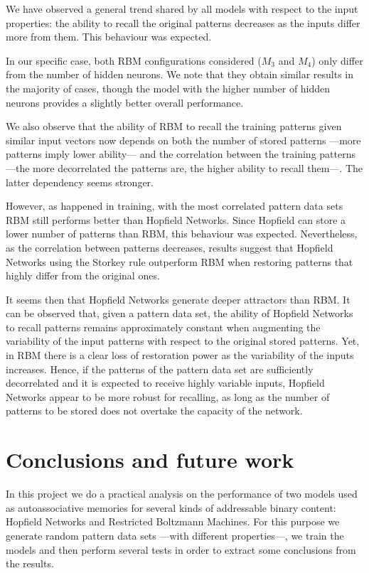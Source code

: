 \documentclass[anon]{CI}
\begin{document}
We have observed a general trend shared by all models with respect to the input properties: the ability to recall the original patterns decreases as the inputs differ more from them. This behaviour was expected.

In our specific case, both RBM configurations considered ($M_3$ and $M_4$) only differ from the number of hidden neurons. We note that they obtain similar results in the majority of cases, though the model with the higher number of hidden neurons provides a slightly better overall performance.

We also observe that the ability of RBM to recall the training patterns given similar input vectors now depends on both the number of stored patterns ---more patterns imply lower ability--- and the correlation between the training patterns ---the more decorrelated the patterns are, the higher ability to recall them---. The latter dependency seems stronger.

However, as happened in training, with the most correlated pattern data sets RBM still performs better than Hopfield Networks. Since Hopfield can store a lower number of patterns than RBM, this behaviour was expected. Nevertheless, as the correlation between patterns decreases, results suggest that Hopfield Networks using the Storkey rule outperform RBM when restoring patterns that highly differ from the original ones. 

It seems then that Hopfield Networks generate deeper attractors than RBM. It can be observed that, given a pattern data set, the ability of Hopfield Networks to recall patterns remains approximately constant when augmenting the variability of the input patterns with respect to the original stored patterns. Yet, in RBM there is a clear loss of restoration power as the variability of the inputs increases. Hence, if the patterns of the pattern data set are sufficiently decorrelated and it is expected to receive highly variable inputs, Hopfield Networks appear to be more robust for recalling, as long as the number of patterns to be stored does not overtake the capacity of the network.


\section{Conclusions and future work}

In this project we do a practical analysis on the performance of two models used as autoassociative memories for several kinds of addressable binary content: Hopfield Networks and Restricted Boltzmann Machines. For this purpose we generate random pattern data sets ---with different properties---, we train the models and then perform several tests in order to extract some conclusions from the results.
\end{document}
